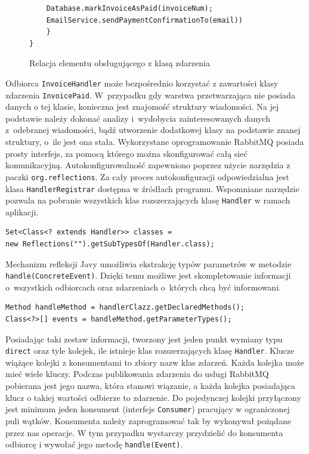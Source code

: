 \documentclass[a4paper]{book}
\begin{document}
{\begin{figure}
\begin{lstlisting}
	Database.markInvoiceAsPaid(invoiceNum);
	EmailService.sendPaymentConfirmationTo(email))
	}
}
	\end{lstlisting}
	\caption{Relacja elementu obsługującego z klasą zdarzenia}
	\label{id:fig:listing:EventHandlerRelation}
\end{figure}
Odbiorca \lstinline|InvoiceHandler| może bezpośrednio korzystać z zawartości klasy zdarzenia \lstinline|InvoicePaid|. W~przypadku gdy warstwa przetwarzająca nie posiada danych o tej klasie, konieczna jest znajomość struktury wiadomości. Na jej podstawie należy dokonać analizy i~wydobycia zainteresowanych danych z~odebranej wiadomości, bądź utworzenie dodatkowej klasy na podstawie znanej struktury, o~ile jest ona stała.
Wykorzystane oprogramowanie RabbitMQ posiada prosty interfejs, za pomocą którego można skonfigurować całą sieć komunikacyjną. Autokonfigurowalność zapewniono poprzez użycie narzędzia z paczki \lstinline|org.reflections|. Za cały proces autokonfiguracji odpowiedzialna jest klasa \lstinline|HandlerRegistrar| dostępna w źródłach programu. Wspomniane narzędzie pozwala na pobranie wszystkich klas rozszerzających klasę \lstinline|Handler| w ramach aplikacji.
\begin{lstlisting}
Set<Class<? extends Handler>> classes = 
new Reflections("").getSubTypesOf(Handler.class);
\end{lstlisting}
Mechanizm refleksji Javy umożliwia ekstrakcję typów parametrów w metodzie \lstinline|handle(ConcreteEvent)|. Dzięki temu możliwe jest skompletowanie informacji o~wszystkich odbiorcach oraz zdarzeniach o~których chcą być informowani.
\begin{lstlisting}
Method handleMethod = handlerClazz.getDeclaredMethods();
Class<?>[] events = handleMethod.getParameterTypes();
\end{lstlisting}

Posiadając taki zestaw informacji, tworzony jest jeden punkt wymiany typu \lstinline|direct| oraz tyle kolejek, ile istnieje klas rozszerzających klasę \lstinline|Handler|. Klucze wiążące kolejki z konsumentami to zbiory nazw klas zdarzeń. Każda kolejka może mieć wiele kluczy. Podczas publikowania zdarzenia do usługi RabbitMQ pobierana jest jego nazwa, która stanowi wiązanie, a każda kolejka posiadająca klucz o takiej wartości odbierze to zdarzenie. Do pojedynczej kolejki przyłączony jest minimum jeden konsument (interfejs \lstinline|Consumer|) pracujący w ograniczonej puli wątków. Konsumenta należy zaprogramować tak by wykonywał pożądane przez nas operacje. W tym przypadku wystarczy przydzielić do konsumenta odbiorcę i wywołać jego metodę \lstinline|handle(Event)|.

}
\end{document}
